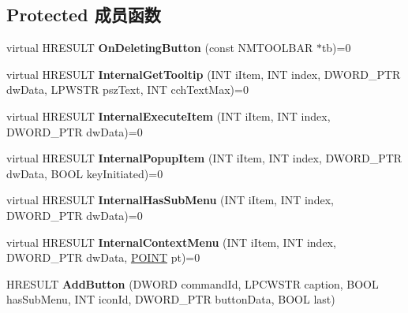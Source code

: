 \subsection*{Protected 成员函数}
\begin{DoxyCompactItemize}
\item 
\mbox{\label{class_c_menu_toolbar_base_a005fef11474a6c5e6af7bdfc0bca91e0}} 
virtual H\+R\+E\+S\+U\+LT {\bfseries On\+Deleting\+Button} (const N\+M\+T\+O\+O\+L\+B\+AR $\ast$tb)=0
\item 
\mbox{\label{class_c_menu_toolbar_base_a6dbf3510f579062e85b40deabb68e2a6}} 
virtual H\+R\+E\+S\+U\+LT {\bfseries Internal\+Get\+Tooltip} (I\+NT i\+Item, I\+NT index, D\+W\+O\+R\+D\+\_\+\+P\+TR dw\+Data, L\+P\+W\+S\+TR psz\+Text, I\+NT cch\+Text\+Max)=0
\item 
\mbox{\label{class_c_menu_toolbar_base_a41664067cbcab8f68b0cae9bbe328a24}} 
virtual H\+R\+E\+S\+U\+LT {\bfseries Internal\+Execute\+Item} (I\+NT i\+Item, I\+NT index, D\+W\+O\+R\+D\+\_\+\+P\+TR dw\+Data)=0
\item 
\mbox{\label{class_c_menu_toolbar_base_a0f9ecd8436548faf561fd8b649fbfe19}} 
virtual H\+R\+E\+S\+U\+LT {\bfseries Internal\+Popup\+Item} (I\+NT i\+Item, I\+NT index, D\+W\+O\+R\+D\+\_\+\+P\+TR dw\+Data, B\+O\+OL key\+Initiated)=0
\item 
\mbox{\label{class_c_menu_toolbar_base_aedb0ab0645628a696de34bd81c554278}} 
virtual H\+R\+E\+S\+U\+LT {\bfseries Internal\+Has\+Sub\+Menu} (I\+NT i\+Item, I\+NT index, D\+W\+O\+R\+D\+\_\+\+P\+TR dw\+Data)=0
\item 
\mbox{\label{class_c_menu_toolbar_base_a14bfe27a50b01c55e56a634e21d19f95}} 
virtual H\+R\+E\+S\+U\+LT {\bfseries Internal\+Context\+Menu} (I\+NT i\+Item, I\+NT index, D\+W\+O\+R\+D\+\_\+\+P\+TR dw\+Data, \hyperlink{structtag_p_o_i_n_t}{P\+O\+I\+NT} pt)=0
\item 
\mbox{\label{class_c_menu_toolbar_base_ae160588011cf01d412d6fdb1fd1167e1}} 
H\+R\+E\+S\+U\+LT {\bfseries Add\+Button} (D\+W\+O\+RD command\+Id, L\+P\+C\+W\+S\+TR caption, B\+O\+OL has\+Sub\+Menu, I\+NT icon\+Id, D\+W\+O\+R\+D\+\_\+\+P\+TR button\+Data, B\+O\+OL last)

\end{DoxyCompactItemize}
